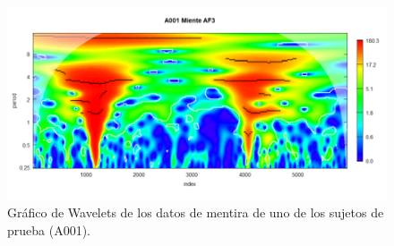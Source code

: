 \begin{figure}
    \centering
    \includegraphics[scale=1]{figuras/Imagen10.png}
    \caption{Gráfico de Wavelets de los datos de mentira de uno de los sujetos de prueba (A001).}
    \label{fig:my_label}
\end{figure}
